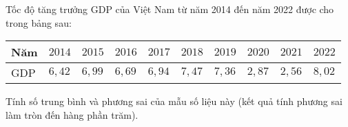 \begin{bt}%
Tốc độ tăng trưởng GDP của Việt Nam từ năm 2014 đến năm 2022 được cho trong bảng sau:
\begin{center}
{\renewcommand\arraystretch{1.5}
\begin{tabular}{|>{\centering\arraybackslash}m{2.3cm}|>{\centering\arraybackslash}m{1cm}|>{\centering\arraybackslash}m{1cm}|>{\centering\arraybackslash}m{1cm}|>{\centering\arraybackslash}m{1cm}|>{\centering\arraybackslash}m{1cm}|>{\centering\arraybackslash}m{1cm}|>{\centering\arraybackslash}m{1cm}|>{\centering\arraybackslash}m{1cm}|>{\centering\arraybackslash}m{1cm}|}
\hline
Năm & $2014$ & $2015$ & $2016$ & $2017$ & $2018$ & $2019$ & $2020$ & $2021$ & $2022$\\
\hline
GDP & $6{,}42$ & $6{,}99$ & $6{,}69$ & $6{,}94$ & $7{,}47$ & $7{,}36$ & $2{,}87$ & $2{,}56$ & $8{,}02$\\
\hline 
\end{tabular}
}
\end{center}
Tính số trung bình và phương sai của mẫu số liệu này (kết quả tính phương sai làm tròn đến hàng 
phần trăm).
\end{bt}

